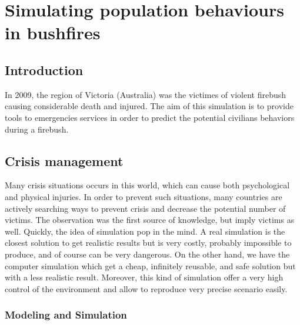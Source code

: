 \chapter{Simulating population behaviours in bushfires}

\author{Geoffrey Danet}

    \section{Introduction}

        In 2009, the region of Victoria (Australia) was the victimes of violent firebush
        causing considerable death and injured. The aim of this simulation is to provide tools to emergencies
        services in order to predict the potential civilians behaviors during a firebush.

    \section{Crisis management}

        Many crisis situations occurs in this world, which can cause both psychological and physical injuries. In order to prevent such
        situations, many countries are actively searching ways to prevent crisis and decrease the potential number of victims.
        The observation was the first source of knowledge, but imply victims as well. Quickly, the idea of simulation pop in the mind.
        A real simulation is the closest solution to get realistic results but is very costly, probably impossible to produce, and of
        course can be very dangerous.
        On the other hand, we have the computer simulation which get a cheap, infinitely reusable, and safe solution but with a less
        realistic result. Moreover, this kind of simulation offer a very high control of the environment and allow to reproduce very precise scenario easily.

        \subsection{Modeling and Simulation}

